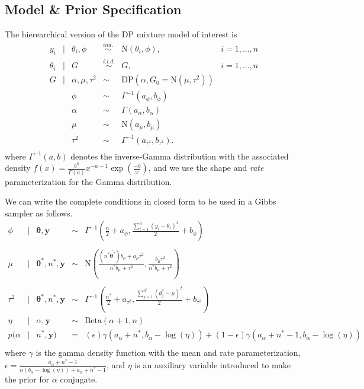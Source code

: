 \documentclass{article}
\def\beginmyfig{\begin{figure}[htbp]\begin{center}}
\def\endmyfig{\end{center}\end{figure}}
\def\suml{\sum\limits_{i=1}^n}
\def\ds{\displaystyle}
\newcommand{\m}[1]{\mathbf{\bm{#1}}} %
\def \stv{ \m{\theta} }
\def \stu{ \m{\theta^*} }
\def \y {\m{y}}
\begin{document}
\subsection{Model \& Prior Specification}
The hierearchical version of the DP mixture model of interest is 
\[
\begin{array}{rclcll}
  y_i &|& \theta_i,\phi &\overset{ind.}{\sim}& \text{N}(\theta_i, \phi), & i = 1,...,n\\
  \theta_i &|& G &\overset{i.i.d.}{\sim}&  G, & i = 1,...,n\\
  G &|& \alpha, \mu, \tau^2 &\sim& \text{DP}(\alpha, G_0=\text{N}(\mu,\tau^2))\\
    && \phi &\sim& \Gamma^{-1}(a_\phi,b_\phi) \\
    && \alpha &\sim& \Gamma(a_\alpha,b_\alpha) \\
    && \mu &\sim& \text{N}(a_\mu,b_\mu) \\
    && \tau^2 &\sim& \Gamma^{-1}(a_{\tau^2},b_{\tau^2}).\\
\end{array}
\]
where $\Gamma^{-1}(a,b)$ denotes the inverse-Gamma distribution with the associated density 
$f(x) = \ds \frac{b^a}{\Gamma(a)} x^{-a-1} \exp\left(\frac{-b}{x}\right)$, and we use the
shape and \emph{rate} parameterization for the Gamma distribution.

We can write the complete conditions in closed form to be used in a Gibbs sampler as follows.
\[
\begin{array} {rclcl}
  \phi &|& \stv, \y &\sim& \Gamma^{-1}\left(\ds\frac{n}{2}+a_\phi,\frac{\suml (y_i-\theta_i)^2}{2} + b_\phi \right)\\
  \\
  \mu &|& \stu, n^*, \y &\sim& \text{N}\left(\ds \frac{(n^*\bar{\stu}) b_\mu + a_\mu\tau^2}{n^*b_\mu + \tau^2},
    \ds\frac{b_\mu \tau^2}{n^* b_\mu + \tau^2} \right)\\
  \\
  \tau^2 &|& \stu, n^*, \y &\sim& \Gamma^{-1}\left(\ds\frac{n^*}{2}+a_{\tau^2},
    \frac{\sum_{j=1}^{n^*} (\theta_j^*-\mu)^2}{2} + b_{\tau^2} \right)\\
  \eta &|& \alpha, \y &\sim& \text{Beta}(\alpha+1,n) \\
  p(\alpha &|& n^*, \y) &=& (\epsilon)\gamma(a_\alpha+n^*, b_\alpha-\log(\eta)) +
    (1-\epsilon)\gamma(a_\alpha+n^*-1, b_\alpha-\log(\eta))\\
\end{array}
\]
where $\gamma$ is the gamma density function with the mean and rate parameterization, 
$\epsilon = \ds\frac{a_\alpha +n^* - 1}{ n(b_\alpha-\log(\eta)) + a_\alpha +n^* -1}$,
and $\eta$ is an auxiliary variable introduced to make the prior for $\alpha$ conjugate. %


\end{document}
